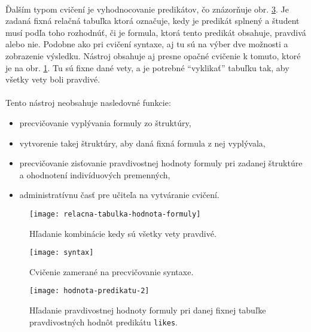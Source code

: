 \paragraph{}
Ďalším typom cvičení je vyhodnocovanie predikátov, čo znázorňuje obr. \ref{fig:hodnota-predikatu-2}. Je zadaná fixná relačná tabuľka ktorá označuje, kedy je predikát splnený a študent musí podľa toho rozhodnúť, či je formula, ktorá tento predikát obsahuje, pravdivá alebo nie. Podobne ako pri cvičení syntaxe, aj tu sú na výber dve možnosti a zobrazenie výsledku. Nástroj obsahuje aj presne opačné cvičenie k tomuto, ktoré je na obr. \ref{fig:fixne-formuly}. Tu sú fixne dané vety, a je potrebné ``vyklikať'' tabuľku tak, aby všetky vety boli pravdivé.

\paragraph{}
Tento nástroj neobsahuje nasledovné funkcie:
\begin{itemize}
	\item precvičovanie vyplývania formuly zo štruktúry,
	\item vytvorenie takej štruktúry, aby daná fixná formula z nej vyplývala,
	\item precvičovanie zisťovanie pravdivostnej hodnoty formuly pri zadanej štruktúre a ohodnotení indivíduových premenných,
	\item administratívnu časť pre učiteľa na vytváranie cvičení.
\end{itemize}

\begin{figure}[h]
	\centering
	\texttt{[image: relacna-tabulka-hodnota-formuly]}
	\caption{Hľadanie kombinácie kedy sú všetky vety pravdivé.}
	\label{fig:fixne-formuly}
\end{figure}

\begin{figure}[h]
	\centering
	\texttt{[image: syntax]}
	\caption{Cvičenie zamerané na precvičovanie syntaxe.}
	\label{fig:syntax}
\end{figure}

\begin{figure}[h]
	\centering
	\texttt{[image: hodnota-predikatu-2]}
	\caption{Hľadanie pravdivostnej hodnoty formuly pri danej fixnej tabuľke pravdivostných hodnôt predikátu \texttt{likes}.}
	\label{fig:hodnota-predikatu-2}
\end{figure}




